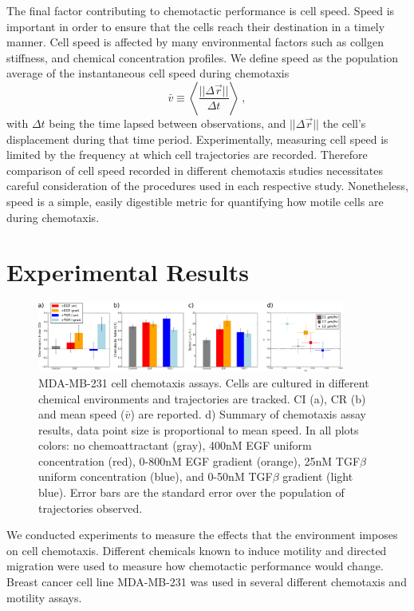 The final factor contributing to chemotactic performance is cell speed. Speed is important in order to ensure that the cells reach their destination in a timely manner. Cell speed is affected by many environmental factors such as collgen stiffness, and chemical concentration profiles. We define speed as the population average of the instantaneous cell speed during chemotaxis
\begin{equation}
    \bar{v} \equiv \left\langle \frac{||\Delta\vec{r}||}{\Delta t} \right\rangle \ ,
\end{equation}
with $\Delta t$ being the time lapsed between observations, and $||\Delta\vec{r}||$ the cell's displacement during that time period.
Experimentally, measuring cell speed is limited by the frequency at which cell trajectories are recorded. Therefore comparison of cell speed recorded in different chemotaxis studies necessitates careful consideration of the procedures used in each respective study. Nonetheless, speed is a simple, easily digestible metric for quantifying how motile cells are during chemotaxis.


\section{Experimental Results}

\begin{figure}
    \centering
    \includegraphics[width=0.90\textwidth]{../fig/ch2_fig2.png}
    \caption{ MDA-MB-231 cell chemotaxis assays. Cells are cultured in different chemical environments and trajectories are tracked. CI (a), CR (b) and mean speed ($\bar{v}$) are reported. d) Summary of chemotaxis assay results, data point size is proportional to mean speed. In all plots colors: no chemoattractant (gray), 400nM EGF uniform concentration (red), 0-800nM EGF gradient (orange), 25nM TGF$\beta$ uniform concentration (blue), and 0-50nM TGF$\beta$ gradient (light blue). Error bars are the standard error over the population of trajectories observed.} \label{fig:ch2_2}
\end{figure}

We conducted experiments to measure the effects that the environment imposes on cell chemotaxis. Different chemicals known to induce motility and directed migration were used to measure how chemotactic performance would change. Breast cancer cell line MDA-MB-231 was used in several different chemotaxis and motility assays.

